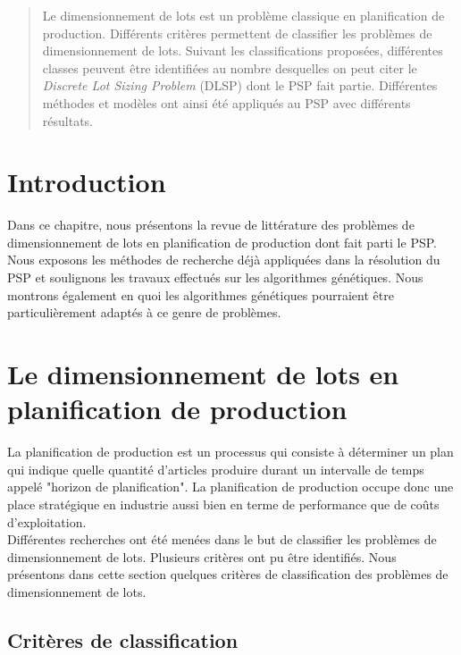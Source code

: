 \begin{abstract}
	Le dimensionnement de lots est un problème classique en planification de production. Différents critères \cite{cathy} permettent de classifier les problèmes de dimensionnement de lots. Suivant les classifications proposées, différentes classes peuvent être identifiées au nombre desquelles on peut citer le \emph{Discrete Lot Sizing Problem} (DLSP) dont le PSP fait partie. Différentes méthodes et modèles ont ainsi été appliqués au PSP \cite{ratheil_master} \cite{ceschia} avec différents résultats.
\end{abstract}

\section*{Introduction}
		
		Dans ce chapitre, nous présentons la revue de littérature des problèmes de dimensionnement de lots en planification de production dont fait parti le PSP. Nous exposons les méthodes de recherche déjà appliquées dans la résolution du PSP et soulignons les travaux effectués sur les algorithmes génétiques. Nous montrons également en quoi les algorithmes génétiques pourraient être particulièrement adaptés à ce genre de problèmes.
		
	\section{Le dimensionnement de lots en planification de production}
	La planification de production est un processus qui consiste à déterminer un plan qui indique quelle quantité d'articles produire durant un intervalle de temps appelé "horizon de planification". La planification de production occupe donc une place stratégique en industrie aussi bien en terme de performance que de coûts d'exploitation.\\
	\hspace*{.5cm} Différentes recherches \cite{dauzere} ont été menées dans le but de classifier les problèmes de dimensionnement de lots. Plusieurs critères ont pu être identifiés. Nous présentons dans cette section quelques critères de classification \cite{cathy} des problèmes de dimensionnement de lots.
	
\subsection{Critères de classification}

